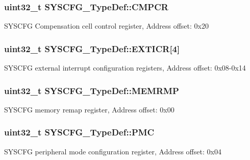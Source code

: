\subsubsection[{\texorpdfstring{C\+M\+P\+CR}{CMPCR}}]{ uint32\+\_\+t S\+Y\+S\+C\+F\+G\+\_\+\+Type\+Def\+::\+C\+M\+P\+CR}\hypertarget{struct_s_y_s_c_f_g___type_def_ada13497abc6402300570ff5f430a612e}{}\label{struct_s_y_s_c_f_g___type_def_ada13497abc6402300570ff5f430a612e}
S\+Y\+S\+C\+FG Compensation cell control register, Address offset\+: 0x20 
\subsubsection[{\texorpdfstring{E\+X\+T\+I\+CR}{EXTICR}}]{ uint32\+\_\+t S\+Y\+S\+C\+F\+G\+\_\+\+Type\+Def\+::\+E\+X\+T\+I\+CR\mbox{[}4\mbox{]}}\hypertarget{struct_s_y_s_c_f_g___type_def_a66a06b3aab7ff5c8fa342f7c1994bf7d}{}\label{struct_s_y_s_c_f_g___type_def_a66a06b3aab7ff5c8fa342f7c1994bf7d}
S\+Y\+S\+C\+FG external interrupt configuration registers, Address offset\+: 0x08-\/0x14 
\subsubsection[{\texorpdfstring{M\+E\+M\+R\+MP}{MEMRMP}}]{ uint32\+\_\+t S\+Y\+S\+C\+F\+G\+\_\+\+Type\+Def\+::\+M\+E\+M\+R\+MP}\hypertarget{struct_s_y_s_c_f_g___type_def_a85b9d3df2274b730327b181c402a7bf5}{}\label{struct_s_y_s_c_f_g___type_def_a85b9d3df2274b730327b181c402a7bf5}
S\+Y\+S\+C\+FG memory remap register, Address offset\+: 0x00 
\subsubsection[{\texorpdfstring{P\+MC}{PMC}}]{ uint32\+\_\+t S\+Y\+S\+C\+F\+G\+\_\+\+Type\+Def\+::\+P\+MC}\hypertarget{struct_s_y_s_c_f_g___type_def_ab5c47c570566cb8ff9d0436c17cc9241}{}\label{struct_s_y_s_c_f_g___type_def_ab5c47c570566cb8ff9d0436c17cc9241}
S\+Y\+S\+C\+FG peripheral mode configuration register, Address offset\+: 0x04 
